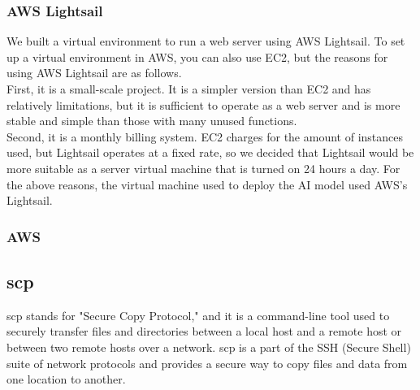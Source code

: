\subsubsection{\textbf{AWS Lightsail}}
We built a virtual environment to run a web server using AWS Lightsail. To set up a virtual environment in AWS, you can also use EC2, but the reasons for using AWS Lightsail are as follows.\\
First, it is a small-scale project. It is a simpler version than EC2 and has relatively limitations, but it is sufficient to operate as a web server and is more stable and simple than those with many unused functions.\\
Second, it is a monthly billing system. EC2 charges for the amount of instances used, but Lightsail operates at a fixed rate, so we decided that Lightsail would be more suitable as a server virtual machine that is turned on 24 hours a day. For the above reasons, the virtual machine used to deploy the AI ​​model used AWS's Lightsail.\\

\subsubsection{\textbf{AWS }}

\subsection{\textbf{scp}}
scp stands for "Secure Copy Protocol," and it is a command-line tool used to securely transfer files and directories between a local host and a remote host or between two remote hosts over a network. scp is a part of the SSH (Secure Shell) suite of network protocols and provides a secure way to copy files and data from one location to another.\\
